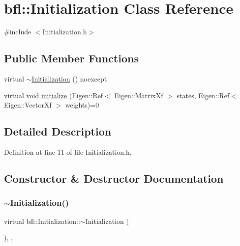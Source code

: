 \hypertarget{classbfl_1_1Initialization}{}\section{bfl\+:\+:Initialization Class Reference}
\label{classbfl_1_1Initialization}


{\ttfamily \#include $<$Initialization.\+h$>$}

\subsection*{Public Member Functions}
\begin{DoxyCompactItemize}
\item 
virtual \mbox{\hyperlink{classbfl_1_1Initialization_a5ee48ad764e9deebe023964b9be32e33}{$\sim$\+Initialization}} () noexcept
\item 
virtual void \mbox{\hyperlink{classbfl_1_1Initialization_aabd4858e78115b904de19d7282f0aad7}{initialize}} (Eigen\+::\+Ref$<$ Eigen\+::\+Matrix\+Xf $>$ states, Eigen\+::\+Ref$<$ Eigen\+::\+Vector\+Xf $>$ weights)=0
\end{DoxyCompactItemize}


\subsection{Detailed Description}


Definition at line 11 of file Initialization.\+h.



\subsection{Constructor \& Destructor Documentation}
\mbox{\label{classbfl_1_1Initialization_a5ee48ad764e9deebe023964b9be32e33}} 
\subsubsection{\texorpdfstring{$\sim$\+Initialization()}{~Initialization()}}
{\footnotesize\ttfamily virtual bfl\+::\+Initialization\+::$\sim$\+Initialization (\begin{DoxyParamCaption}{ }\end{DoxyParamCaption})\hspace{0.3cm}{\ttfamily [inline]}, {\ttfamily [virtual]}, {\ttfamily [noexcept]}}



